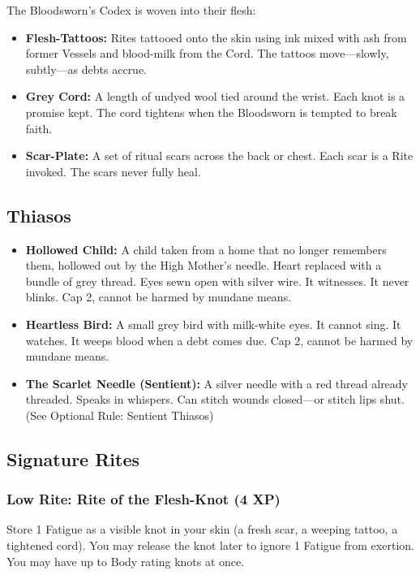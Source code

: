 The Bloodsworn's Codex is woven into their flesh:

\begin{itemize}
\item \textbf{Flesh-Tattoos:} Rites tattooed onto the skin using ink mixed with ash from former Vessels and blood-milk from the Cord. The tattoos move—slowly, subtly—as debts accrue.
\item \textbf{Grey Cord:} A length of undyed wool tied around the wrist. Each knot is a promise kept. The cord tightens when the Bloodsworn is tempted to break faith.
\item \textbf{Scar-Plate:} A set of ritual scars across the back or chest. Each scar is a Rite invoked. The scars never fully heal.
\end{itemize}

\subsection{Thiasos}

\begin{itemize}
\item \textbf{Hollowed Child:} A child taken from a home that no longer remembers them, hollowed out by the High Mother's needle. Heart replaced with a bundle of grey thread. Eyes sewn open with silver wire. It witnesses. It never blinks. Cap 2, cannot be harmed by mundane means.
\item \textbf{Heartless Bird:} A small grey bird with milk-white eyes. It cannot sing. It watches. It weeps blood when a debt comes due. Cap 2, cannot be harmed by mundane means.
\item \textbf{The Scarlet Needle (Sentient):} A silver needle with a red thread already threaded. Speaks in whispers. Can stitch wounds closed—or stitch lips shut. (See Optional Rule: Sentient Thiasos)
\end{itemize}

\subsection{Signature Rites}

\subsubsection{Low Rite: Rite of the Flesh-Knot (4 XP)}

Store 1 Fatigue as a visible knot in your skin (a fresh scar, a weeping tattoo, a tightened cord). You may release the knot later to ignore 1 Fatigue from exertion. You may have up to Body rating knots at once.

